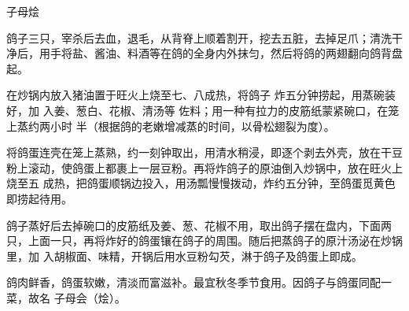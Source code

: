\begin{recipe}{子母烩}

\ingredients


\preparation

\step 鸽子三只，宰杀后去血，退毛，从背脊上顺着割开，挖去五脏，去掉足爪；清洗干
净后，用手将盐、酱油、料酒等在鸽的全身内外抹匀，然后将鸽的两翅翻向鸽背盘起。

在炒锅内放入猪油置于旺火上烧至七、八成热，将鸽子 炸五分钟捞起，用蒸碗装好，加
入姜、葱白、花椒、清汤等 佐料；用一种有拉力的皮筋纸蒙紧碗口，在笼上蒸约两小时
半（根据鸽的老嫩增减蒸的时间，以骨松翅裂为度）。

\step 将鸽蛋连壳在笼上蒸熟，约一刻钟取出，用清水稍浸，即逐个剥去外壳，放在干豆
粉上滚动，使鸽蛋上都裹上一层豆粉。再将炸鸽子的原油倒入炒锅中，放在旺火上烧至五
成热，把鸽蛋顺锅边投入，用汤瓢慢慢拨动，炸约五分钟，至鸽蛋觅黄色即捞起待用。

\step 鸽子蒸好后去掉碗口的皮筋纸及姜、葱、花椒不用，取出鸽子摆在盘内，下面两
只，上面一只，再将炸好的鸽蛋镶在鸽子的周围。随后把蒸鸽子的原汁汤泌在炒锅里，加
入胡椒面、味精，开锅后用水豆粉勾芡，淋于鸽子及鸽蛋上即成。

\features

鸽肉鲜香，鸽蛋软嫩，清淡而富滋补。最宜秋冬季节食用。因鸽子与鸽蛋同配一菜，故名
子母会（烩）。

\end{recipe}

